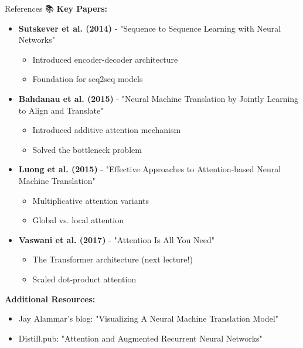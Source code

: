 \documentclass[aspectratio=169]{beamer}
\begin{document}
\begin{frame}[shrink=10]{References 📚}
\textbf{Key Papers:}

\vspace{0.5em}

\begin{itemize}\setlength{\itemsep}{0pt}
    \item \textbf{Sutskever et al. (2014)} - "Sequence to Sequence Learning with Neural Networks"
    \begin{itemize}\setlength{\itemsep}{0pt}
        \item Introduced encoder-decoder architecture
        \item Foundation for seq2seq models
    \end{itemize}

    \vspace{0.3em}

    \item \textbf{Bahdanau et al. (2015)} - "Neural Machine Translation by Jointly Learning to Align and Translate"
    \begin{itemize}\setlength{\itemsep}{0pt}
        \item Introduced additive attention mechanism
        \item Solved the bottleneck problem
    \end{itemize}

    \vspace{0.3em}

    \item \textbf{Luong et al. (2015)} - "Effective Approaches to Attention-based Neural Machine Translation"
    \begin{itemize}\setlength{\itemsep}{0pt}
        \item Multiplicative attention variants
        \item Global vs. local attention
    \end{itemize}

    \vspace{0.3em}

    \item \textbf{Vaswani et al. (2017)} - "Attention Is All You Need"
    \begin{itemize}\setlength{\itemsep}{0pt}
        \item The Transformer architecture (next lecture!)
        \item Scaled dot-product attention
    \end{itemize}
\end{itemize}

\vspace{0.5em}

\textbf{Additional Resources:}
\begin{itemize}\setlength{\itemsep}{0pt}
    \item Jay Alammar's blog: "Visualizing A Neural Machine Translation Model"
    \item Distill.pub: "Attention and Augmented Recurrent Neural Networks"
\end{itemize}
\end{frame}
\end{document}
